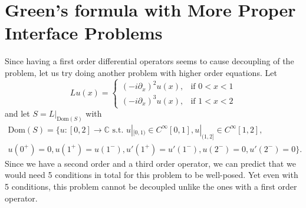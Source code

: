 \documentclass[11pt,reqno,oneside,a4paper]{article}
\begin{document}
\section*{Green's formula with More Proper Interface Problems}
Since having a first order differential operators seems to cause decoupling of the problem, let us try doing another problem with higher order equations. Let 
\[
Lu(x)= 
\begin{cases}
(-i\partial_x)^2u(x),& \text{if } 0 < x < 1\\
(-i\partial_x)^3u(x),& \text{if } 1 < x <2
\end{cases}
\]
and let $S = L|_{\text{Dom}(S)}$ with
\begin{multline*}
\text{Dom}(S) = \{u:[0,2] \to \mathbb{C} \text{ s.t. } u|_{[0,1)} \in C^\infty[0,1], u|_{(1,2]} \in C^\infty[1,2],\\ u(0^+) = 0, u(1^+)=u(1^-),  u'(1^+)=u'(1^-), u(2^-)=0, u'(2^-)=0\}.
\end{multline*} 
Since we have a second order and a third order operator, we can predict that we would need 5 conditions in total for this problem to be well-posed. Yet even with 5 conditions, this problem cannot be decoupled unlike the ones with a first order operator.
\end{document}
